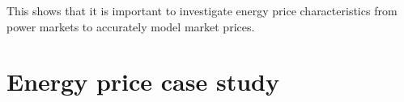This shows that it is important to investigate energy price characteristics from power markets to accurately model market prices. 



%
%
%
%


\section{Energy price case study}



